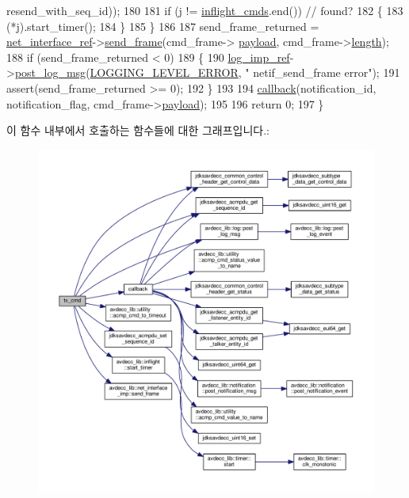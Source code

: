 \begin{DoxyCode}
      resend\_with\_seq\_id));
180 
181         \textcolor{keywordflow}{if} (j != \hyperlink{classavdecc__lib_1_1acmp__controller__state__machine_a0475b054c1890c88809394d9cef2a4c0}{inflight\_cmds}.end()) \textcolor{comment}{// found?}
182         \{
183             (*j).start\_timer();
184         \}
185     \}
186 
187     send\_frame\_returned = \hyperlink{namespaceavdecc__lib_adb4da03bc65b7846cc240ee919bbde19}{net\_interface\_ref}->\hyperlink{classavdecc__lib_1_1net__interface__imp_ac1a430cb59bcfc3b43ed26b624db5dea}{send\_frame}(cmd\_frame->
      \hyperlink{structjdksavdecc__frame_a220ad076814a31ae0163e722e523de46}{payload}, cmd\_frame->\hyperlink{structjdksavdecc__frame_a1892eba2086d12ac2b09005aeb09ea3b}{length});
188     \textcolor{keywordflow}{if} (send\_frame\_returned < 0)
189     \{
190         \hyperlink{namespaceavdecc__lib_acbe3e2a96ae6524943ca532c87a28529}{log\_imp\_ref}->\hyperlink{classavdecc__lib_1_1log_a68139a6297697e4ccebf36ccfd02e44a}{post\_log\_msg}(\hyperlink{namespaceavdecc__lib_a501055c431e6872ef46f252ad13f85cdaf2c4481208273451a6f5c7bb9770ec8a}{LOGGING\_LEVEL\_ERROR}, \textcolor{stringliteral}{"
      netif\_send\_frame error"});
191         assert(send\_frame\_returned >= 0);
192     \}
193 
194     \hyperlink{classavdecc__lib_1_1acmp__controller__state__machine_a5803ae7099ff1a9c0721244e3d9b77b4}{callback}(notification\_id, notification\_flag, cmd\_frame->\hyperlink{structjdksavdecc__frame_a220ad076814a31ae0163e722e523de46}{payload});
195 
196     \textcolor{keywordflow}{return} 0;
197 \}
\end{DoxyCode}


이 함수 내부에서 호출하는 함수들에 대한 그래프입니다.\+:
\nopagebreak
\begin{figure}[H]
\begin{center}
\leavevmode
\includegraphics[width=350pt]{classavdecc__lib_1_1acmp__controller__state__machine_a1a1c2c9ae3773c01cbad352f2a2c2dfc_cgraph}
\end{center}
\end{figure}




